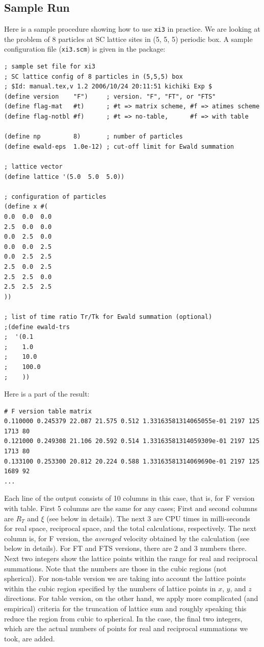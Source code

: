\documentclass{book}
\begin{document}
\subsection{Sample Run}
Here is a sample procedure showing how to use {\tt xi3} in practice.
We are looking at the problem of 8 particles at SC lattice sites
in (5, 5, 5) periodic box.
A sample configuration file ({\tt xi3.scm}) is given in the package:
{\small
\begin{verbatim}
; sample set file for xi3
; SC lattice config of 8 particles in (5,5,5) box
; $Id: manual.tex,v 1.2 2006/10/24 20:11:51 kichiki Exp $
(define version    "F")     ; version. "F", "FT", or "FTS"
(define flag-mat   #t)      ; #t => matrix scheme, #f => atimes scheme
(define flag-notbl #f)      ; #t => no-table,      #f => with table

(define np         8)       ; number of particles
(define ewald-eps  1.0e-12) ; cut-off limit for Ewald summation

; lattice vector
(define lattice '(5.0  5.0  5.0))

; configuration of particles
(define x #(
0.0  0.0  0.0
2.5  0.0  0.0
0.0  2.5  0.0
0.0  0.0  2.5
0.0  2.5  2.5
2.5  0.0  2.5
2.5  2.5  0.0
2.5  2.5  2.5
))

; list of time ratio Tr/Tk for Ewald summation (optional)
;(define ewald-trs
;  '(0.1
;    1.0
;    10.0
;    100.0
;    ))
\end{verbatim}
}
Here is a part of the result:
{\small
\begin{verbatim}
# F version table matrix
0.110000 0.245379 22.087 21.575 0.512 1.33163581314065055e-01 2197 125 1713 80
0.121000 0.249308 21.106 20.592 0.514 1.33163581314059309e-01 2197 125 1713 80
0.133100 0.253300 20.812 20.224 0.588 1.33163581314069690e-01 2197 125 1689 92
...
\end{verbatim}
}
Each line of the output consists of 10 columns in this case,
that is, for F version with table.
First 5 columns are the same for any cases;
First and second columns are $R_T$ and $\xi$ (see below in details).
The next 3 are CPU times in milli-seconds
for real space, reciprocal space, and the total
calculations, respectively.
The next column is, for F version, the {\it averaged} velocity
obtained by the calculation (see below in details).
For FT and FTS versions, there are 2 and 3 numbers there.
Next two integers show the lattice points within the range
for real and reciprocal summations. Note that the numbers 
are those in the cubic regions (not spherical). For non-table version
we are taking into account the lattice points within the cubic region
specified by the numbers of lattice points in $x$, $y$, and $z$ directions.
For table version, on the other hand, we apply more complicated 
(and empirical) criteria for the truncation of lattice sum and
roughly speaking this reduce the region from cubic to spherical.
In the case, the final two integers, which are the actual numbers 
of points for real and reciprocal summations we took, are added.
\end{document}
